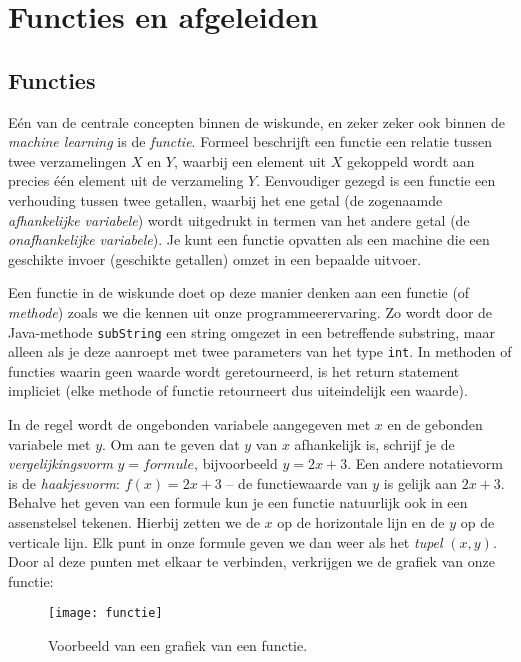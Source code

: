 \section{Functies en afgeleiden}



\subsection{Functies}

Eén van de centrale concepten binnen de wiskunde, en zeker zeker ook binnen de \textit{machine learning} is de \textit{functie}. Formeel beschrijft een functie een relatie tussen twee verzamelingen $X$ en $Y$, waarbij een element uit $X$ gekoppeld wordt aan precies één element uit de verzameling $Y$. Eenvoudiger gezegd is een functie een verhouding tussen twee getallen, waarbij het ene getal (de zogenaamde \textit{afhankelijke variabele}) wordt uitgedrukt in termen van het andere getal (de \textit{onafhankelijke variabele}). Je kunt een functie opvatten als een machine die een geschikte invoer (geschikte getallen) omzet in een bepaalde uitvoer.

Een functie in de wiskunde doet op deze manier denken aan een functie (of \textit{methode}) zoals we die kennen uit onze programmeerervaring. Zo wordt door de Java-methode \texttt{subString} een string omgezet in een betreffende substring, maar alleen als je deze aanroept met twee parameters van het type \texttt{int}. In methoden of functies waarin geen waarde wordt geretourneerd, is het return statement impliciet (elke methode of functie retourneert dus uiteindelijk een waarde).

In de regel wordt de ongebonden variabele aangegeven met $x$ en de gebonden variabele met $y$. Om aan te geven dat $y$ van $x$ afhankelijk is, schrijf je de \textit{vergelijkingsvorm} $y=formule$, bijvoorbeeld $y=2x+3$. Een andere notatievorm is de \textit{haakjesvorm}: $f(x) = 2x+3$ – de functiewaarde van $y$ is gelijk aan $2x+3$. Behalve het geven van een formule kun je een functie natuurlijk ook in een assenstelsel tekenen. Hierbij zetten we de $x$ op de horizontale lijn en de $y$ op de verticale lijn. Elk punt in onze formule geven we dan weer als het \textit{tupel} $(x,y)$. Door al deze punten met elkaar te verbinden, verkrijgen we de grafiek van onze functie:

\begin{figure}[h]
    \centering
    \texttt{[image: functie]}
    \caption{Voorbeeld van een grafiek van een functie.\label{img:functie}}
\end{figure}

